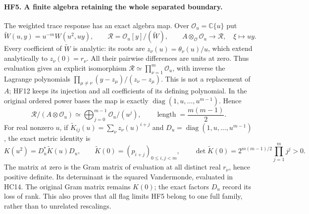 \documentclass[11pt,a4paper]{article}
\theoremstyle{definition}\newtheorem{definition}[theorem]{Definition}
\begin{document}
\paragraph{HF5. A finite algebra retaining the whole separated boundary.}
The weighted trace response has an exact algebra map. Over
$\mathcal O_u=\mathbb C\{u\}$ put
\[
 \widetilde W(u,y)=u^{-m}W(u^2,uy),\qquad
 \mathscr R=\mathcal O_u[y]/(\widetilde W),\qquad
 A\otimes_{\mathcal O}\mathcal O_u\longrightarrow\mathscr R,
       \quad\xi\longmapsto uy.
 \tag{HF12}
\]
Every coefficient of $\widetilde W$ is analytic: its roots are
$z_\nu(u)=\theta_\nu(u)/u$, which extend analytically to
$z_\nu(0)=r_\nu$. All their pairwise differences are units at zero.
Thus evaluation gives an explicit isomorphism
$\mathscr R\simeq\prod_{\nu=1}^m\mathcal O_u$, with inverse
the Lagrange polynomials
$\prod_{\mu\ne\nu}(y-z_\mu)/(z_\nu-z_\mu)$.
This is not a replacement of $A$; HF12 keeps its injection and
all coefficients of its defining polynomial. In the original
ordered power bases the map is exactly
$\operatorname{diag}(1,u,\ldots,u^{m-1})$. Hence
\[
 \mathscr R/(A\otimes\mathcal O_u)
     \simeq\bigoplus_{j=0}^{m-1}\mathcal O_u/(u^j),\qquad
 \operatorname{length}=\frac{m(m-1)}2.
 \tag{HF13}
\]
For real nonzero $u$, if $\widetilde K_{ij}(u)=\sum_\nu z_\nu(u)^{i+j}$
and $D_u=\operatorname{diag}(1,u,\ldots,u^{m-1})$, the exact
metric identity is
\[
 K(u^2)=D_u^*\widetilde K(u)D_u,\qquad
 \widetilde K(0)=(p_{i+j})_{0\le i,j<m},\qquad
 \det\widetilde K(0)=2^{m(m-1)/2}\prod_{j=1}^m j^j>0.
 \tag{HF14}
\]
The matrix at zero is the Gram matrix of evaluation at all
distinct real $r_\nu$, hence positive definite. Its determinant
is the squared Vandermonde, evaluated in HC14. The original
Gram matrix remains $K(0)$; the exact factors $D_u$ record its
loss of rank. This also proves that all flag limits HF5 belong
to one full family, rather than to unrelated rescalings.
\end{document}
